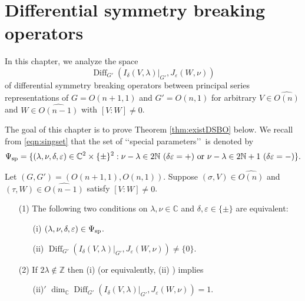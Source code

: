 \newpage
\section{Differential symmetry breaking operators}
\label{sec:DSVO}

In this chapter,
 we analyze the space
\[
 {\operatorname{Diff}}_{G'}
  (I_{\delta}(V,\lambda)|_{G'},J_{\varepsilon}(W,\nu))
\]
of 
 differential symmetry breaking operators
between principal series representations of $G=O(n+1,1)$ and $G'=O(n,1)$
 for arbitrary $V \in \widehat{O(n)}$ and $W \in \widehat{O(n-1)}$
 with 
$[V:W]\ne 0$.  



The goal of this chapter is to prove Theorem \ref{thm:existDSBO} below.  
We recall from \eqref{eqn:singset} that 
 the set of \lq\lq{special parameters}\rq\rq\ is denoted by 
\[
 \Psi_{{\operatorname{sp}}}
=\{(\lambda,\nu,\delta,\varepsilon) \in {\mathbb{C}}^2 \times \{\pm\}^2:
\text{$\nu-\lambda \in 2 {\mathbb{N}}$
 ($\delta\varepsilon = +$)
 or 
$\nu-\lambda \in 2 {\mathbb{N}}+1$
 ($\delta\varepsilon = -$)}
\}.  
\]
\begin{theorem}
\label{thm:existDSBO}
Let $(G, G')=(O(n+1,1), O(n,1))$.  
Suppose $(\sigma,V) \in \widehat{O(n)}$ and $(\tau,W) \in \widehat{O(n-1)}$
 satisfy $[V:W]\ne 0$.  
\begin{enumerate}
\item[{\rm{(1)}}]
The following two conditions on $\lambda, \nu \in {\mathbb{C}}$
 and $\delta, \varepsilon \in \{\pm\}$
 are equivalent:
\begin{enumerate}
\item[{\rm{(i)}}]
$(\lambda,\nu,\delta,\varepsilon) \in \Psi_{{\operatorname{sp}}}$.  
\item[{\rm{(ii)}}]
${\operatorname{Diff}}_{G'}
  (I_{\delta}(V,\lambda)|_{G'},J_{\varepsilon}(W,\nu)) \ne \{0\}.
$
\end{enumerate}
\item[{\rm{(2)}}]
If $2 \lambda \not \in {\mathbb{Z}}$ 
then {\rm{(i)}} (or equivalently, (ii) ) implies
\begin{enumerate}
\item[{\rm{(ii)$'$}}]
$
\dim_{\mathbb{C}} {\operatorname{Diff}}_{G'}
  (I_{\delta}(V,\lambda)|_{G'},J_{\varepsilon}(W,\nu)) =1.  
$
\end{enumerate}
\end{enumerate}
\end{theorem}



